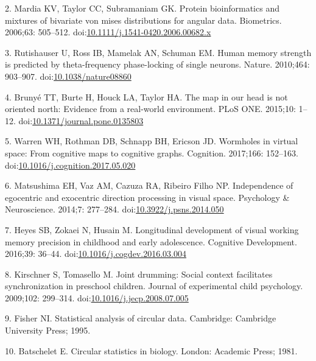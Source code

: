 \documentclass[11pt,]{article}
\begin{document}
\leavevmode\hypertarget{ref-mardia2007protein}{}%
2. Mardia KV, Taylor CC, Subramaniam GK. Protein bioinformatics and
mixtures of bivariate von mises distributions for angular data.
Biometrics. 2006;63: 505--512.
doi:\href{https://doi.org/10.1111/j.1541-0420.2006.00682.x}{10.1111/j.1541-0420.2006.00682.x}

\leavevmode\hypertarget{ref-rutishauser2010human}{}%
3. Rutishauser U, Ross IB, Mamelak AN, Schuman EM. Human memory strength
is predicted by theta-frequency phase-locking of single neurons. Nature.
2010;464: 903--907.
doi:\href{https://doi.org/10.1038/nature08860}{10.1038/nature08860}

\leavevmode\hypertarget{ref-brunye2015map}{}%
4. Brunyé TT, Burte H, Houck LA, Taylor HA. The map in our head is not
oriented north: Evidence from a real-world environment. PLoS ONE.
2015;10: 1--12.
doi:\href{https://doi.org/10.1371/journal.pone.0135803}{10.1371/journal.pone.0135803}

\leavevmode\hypertarget{ref-warren2017wormholes}{}%
5. Warren WH, Rothman DB, Schnapp BH, Ericson JD. Wormholes in virtual
space: From cognitive maps to cognitive graphs. Cognition. 2017;166:
152--163.
doi:\href{https://doi.org/10.1016/j.cognition.2017.05.020}{10.1016/j.cognition.2017.05.020}

\leavevmode\hypertarget{ref-matsushima2014independence}{}%
6. Matsushima EH, Vaz AM, Cazuza RA, Ribeiro Filho NP. Independence of
egocentric and exocentric direction processing in visual space.
Psychology \& Neuroscience. 2014;7: 277--284.
doi:\href{https://doi.org/10.3922/j.psns.2014.050}{10.3922/j.psns.2014.050}

\leavevmode\hypertarget{ref-heyes2016longitudinal}{}%
7. Heyes SB, Zokaei N, Husain M. Longitudinal development of visual
working memory precision in childhood and early adolescence. Cognitive
Development. 2016;39: 36--44.
doi:\href{https://doi.org/10.1016/j.cogdev.2016.03.004}{10.1016/j.cogdev.2016.03.004}

\leavevmode\hypertarget{ref-kirschner2009joint}{}%
8. Kirschner S, Tomasello M. Joint drumming: Social context facilitates
synchronization in preschool children. Journal of experimental child
psychology. 2009;102: 299--314.
doi:\href{https://doi.org/10.1016/j.jecp.2008.07.005}{10.1016/j.jecp.2008.07.005}

\leavevmode\hypertarget{ref-fisher1995statistical}{}%
9. Fisher NI. Statistical analysis of circular data. Cambridge:
Cambridge University Press; 1995.

\leavevmode\hypertarget{ref-Batschelet1981}{}%
10. Batschelet E. Circular statistics in biology. London: Academic
Press; 1981.
\end{document}
